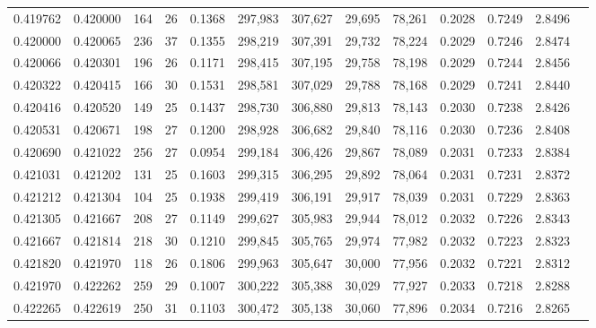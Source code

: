 \begin{tabular}{rrrrrrrrrrrrr}
0.419762 & 0.420000 &    164 &    26 &                                     0.1368 & 297,983 & 307,627 &  29,695 &  78,261 & 0.2028 & 0.7249 & 2.8496 \\
0.420000 & 0.420065 &    236 &    37 &                                     0.1355 & 298,219 & 307,391 &  29,732 &  78,224 & 0.2029 & 0.7246 & 2.8474 \\
0.420066 & 0.420301 &    196 &    26 &                                     0.1171 & 298,415 & 307,195 &  29,758 &  78,198 & 0.2029 & 0.7244 & 2.8456 \\
0.420322 & 0.420415 &    166 &    30 &                                     0.1531 & 298,581 & 307,029 &  29,788 &  78,168 & 0.2029 & 0.7241 & 2.8440 \\
0.420416 & 0.420520 &    149 &    25 &                                     0.1437 & 298,730 & 306,880 &  29,813 &  78,143 & 0.2030 & 0.7238 & 2.8426 \\
0.420531 & 0.420671 &    198 &    27 &                                     0.1200 & 298,928 & 306,682 &  29,840 &  78,116 & 0.2030 & 0.7236 & 2.8408 \\
0.420690 & 0.421022 &    256 &    27 &                                     0.0954 & 299,184 & 306,426 &  29,867 &  78,089 & 0.2031 & 0.7233 & 2.8384 \\
0.421031 & 0.421202 &    131 &    25 &                                     0.1603 & 299,315 & 306,295 &  29,892 &  78,064 & 0.2031 & 0.7231 & 2.8372 \\
0.421212 & 0.421304 &    104 &    25 &                                     0.1938 & 299,419 & 306,191 &  29,917 &  78,039 & 0.2031 & 0.7229 & 2.8363 \\
0.421305 & 0.421667 &    208 &    27 &                                     0.1149 & 299,627 & 305,983 &  29,944 &  78,012 & 0.2032 & 0.7226 & 2.8343 \\
0.421667 & 0.421814 &    218 &    30 &                                     0.1210 & 299,845 & 305,765 &  29,974 &  77,982 & 0.2032 & 0.7223 & 2.8323 \\
0.421820 & 0.421970 &    118 &    26 &                                     0.1806 & 299,963 & 305,647 &  30,000 &  77,956 & 0.2032 & 0.7221 & 2.8312 \\
0.421970 & 0.422262 &    259 &    29 &                                     0.1007 & 300,222 & 305,388 &  30,029 &  77,927 & 0.2033 & 0.7218 & 2.8288 \\
0.422265 & 0.422619 &    250 &    31 &                                     0.1103 & 300,472 & 305,138 &  30,060 &  77,896 & 0.2034 & 0.7216 & 2.8265 \\

\end{tabular}
